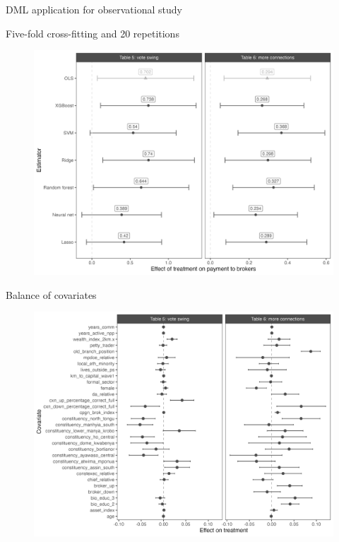 \documentclass[10pt,table,aspectratio=169]{beamer}
\begin{document}
\begin{frame}[plain, label = two_dimensions]{DML application for observational study}

Five-fold cross-fitting and 20 repetitions

\begin{figure}[H]
  \centering
  \includegraphics[height=0.9\textheight]{figures/observational_coefplot_dml.png}
\end{figure}
\end{frame}


\begin{frame}[plain, label = two_dimensions]{Balance of covariates}

\begin{figure}[H]
 \includegraphics[height=0.9\textheight]{figures/observational_coefplot_balance.png}
\end{figure}

\end{frame}
\end{document}
